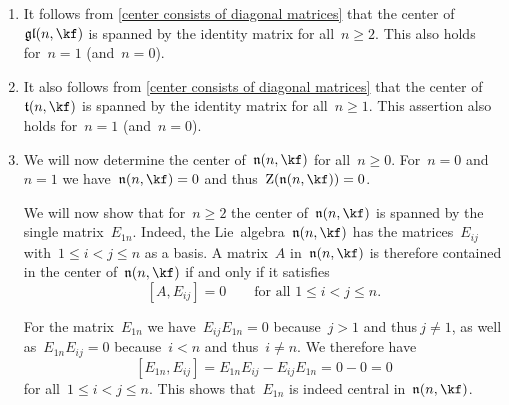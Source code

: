 \begin{example}
	\label{examples of centers}
	\leavevmode
	\begin{enumerate}
		\item
			It follows from \cref{center consists of diagonal matrices} that the center of~$\gllie(n, \kf)$ is spanned by the identity matrix for all~$n \geq 2$.
			This also holds for~$n = 1$ (and~$n = 0$).
		\item
			It also follows from \cref{center consists of diagonal matrices} that the center of~$\trianglie(n, \kf)$ is spanned by the identity matrix for all~$n \geq 1$.
			This assertion also holds for~$n = 1$ (and~$n = 0$).
		\item
			We will now determine the center of~$\upperlie(n, \kf)$ for all~$n \geq 0$.
			For~$n = 0$ and~$n = 1$ we have~$\upperlie(n, \kf) = 0$ and thus~$\centerlie( \upperlie(n, \kf) ) = 0$.

			We will now show that for~$n \geq 2$ the center of~$\upperlie(n, \kf)$ is spanned by the single matrix~$E_{1n}$.
			Indeed, the Lie~algebra~$\upperlie(n, \kf)$ has the matrices~$E_{ij}$ with~$1 \leq i < j \leq n$ as a basis.
			A matrix~$A$ in~$\upperlie(n, \kf)$ is therefore contained in the center of~$\upperlie(n, \kf)$ if and only if it satisfies
			\[
				[A, E_{ij}] = 0
				\qquad
				\text{for all~$1 \leq i < j \leq n$.}
			\]

			For the matrix~$E_{1n}$ we have~$E_{ij} E_{1n} = 0$ because~$j > 1$ and thus$~j \neq 1$, as well as~$E_{1n} E_{ij} = 0$ because~$i < n$ and thus~$i \neq n$.
			We therefore have
			\[
				[E_{1n}, E_{ij}]
				=
				E_{1n} E_{ij} - E_{ij} E_{1n}
				=
				0 - 0
				=
				0
			\]
			for all~$1 \leq i < j \leq n$.
			This shows that~$E_{1n}$ is indeed central in~$\upperlie(n, \kf)$.


\end{enumerate}
\end{example}
